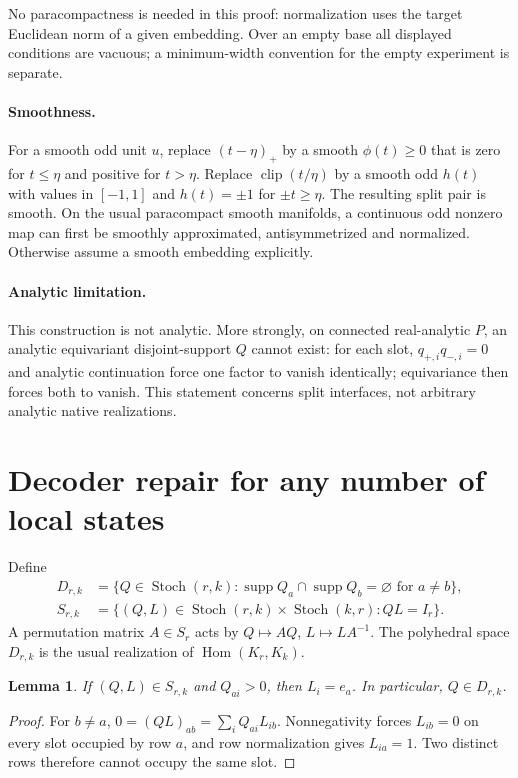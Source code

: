 \documentclass[11pt]{article}
\newtheorem{lemma}[theorem]{Lemma}
\theoremstyle{definition}
\newcommand{\St}{\operatorname{Stoch}}
\newcommand{\Hom}{\operatorname{Hom}}
\newcommand{\supp}{\operatorname{supp}}
\newcommand{\clip}{\operatorname{clip}}
\begin{document}
No paracompactness is needed in this proof: normalization uses the target Euclidean norm of a given embedding. Over an empty base all displayed conditions are vacuous; a minimum-width convention for the empty experiment is separate.

\paragraph{Smoothness.}
For a smooth odd unit $u$, replace $(t-\eta)_+$ by a smooth $\phi(t)\geq0$ that is zero for $t\leq\eta$ and positive for $t>\eta$. Replace $\clip(t/\eta)$ by a smooth odd $h(t)$ with values in $[-1,1]$ and $h(t)=\pm1$ for $\pm t\geq\eta$. The resulting split pair is smooth. On the usual paracompact smooth manifolds, a continuous odd nonzero map can first be smoothly approximated, antisymmetrized and normalized. Otherwise assume a smooth embedding explicitly.

\paragraph{Analytic limitation.}
This construction is not analytic. More strongly, on connected real-analytic $P$, an analytic equivariant disjoint-support $Q$ cannot exist: for each slot, $q_{+,i}q_{-,i}=0$ and analytic continuation force one factor to vanish identically; equivariance then forces both to vanish. This statement concerns split interfaces, not arbitrary analytic native realizations.

\section{Decoder repair for any number of local states}
Define
\begin{align*}
 D_{r,k}&=\{Q\in\St(r,k):\supp Q_a\cap\supp Q_b=\varnothing\text{ for }a\ne b\},\\
 S_{r,k}&=\{(Q,L)\in\St(r,k)\times\St(k,r):QL=I_r\}.
\end{align*}
A permutation matrix $A\in S_r$ acts by $Q\mapsto AQ$, $L\mapsto LA^{-1}$. The polyhedral space $D_{r,k}$ is the usual realization of $\Hom(K_r,K_k)$.

\begin{lemma}\label{lem:forceddecoder}
If $(Q,L)\in S_{r,k}$ and $Q_{ai}>0$, then $L_i=e_a$. In particular, $Q\in D_{r,k}$.
\end{lemma}
\begin{proof}
For $b\ne a$, $0=(QL)_{ab}=\sum_iQ_{ai}L_{ib}$. Nonnegativity forces $L_{ib}=0$ on every slot occupied by row $a$, and row normalization gives $L_{ia}=1$. Two distinct rows therefore cannot occupy the same slot.
\end{proof}
\end{document}
